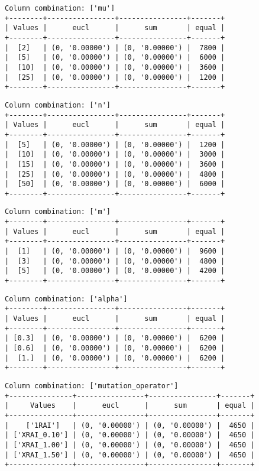\documentclass{article}
\begin{document}
\begin{verbatim}
Column combination: ['mu']
+--------+----------------+----------------+-------+
| Values |      eucl      |      sum       | equal |
+--------+----------------+----------------+-------+
|  [2]   | (0, '0.00000') | (0, '0.00000') |  7800 |
|  [5]   | (0, '0.00000') | (0, '0.00000') |  6000 |
|  [10]  | (0, '0.00000') | (0, '0.00000') |  3600 |
|  [25]  | (0, '0.00000') | (0, '0.00000') |  1200 |
+--------+----------------+----------------+-------+
\end{verbatim}

\begin{verbatim}
Column combination: ['n']
+--------+----------------+----------------+-------+
| Values |      eucl      |      sum       | equal |
+--------+----------------+----------------+-------+
|  [5]   | (0, '0.00000') | (0, '0.00000') |  1200 |
|  [10]  | (0, '0.00000') | (0, '0.00000') |  3000 |
|  [15]  | (0, '0.00000') | (0, '0.00000') |  3600 |
|  [25]  | (0, '0.00000') | (0, '0.00000') |  4800 |
|  [50]  | (0, '0.00000') | (0, '0.00000') |  6000 |
+--------+----------------+----------------+-------+
\end{verbatim}

\begin{verbatim}
Column combination: ['m']
+--------+----------------+----------------+-------+
| Values |      eucl      |      sum       | equal |
+--------+----------------+----------------+-------+
|  [1]   | (0, '0.00000') | (0, '0.00000') |  9600 |
|  [3]   | (0, '0.00000') | (0, '0.00000') |  4800 |
|  [5]   | (0, '0.00000') | (0, '0.00000') |  4200 |
+--------+----------------+----------------+-------+
\end{verbatim}

\begin{verbatim}
Column combination: ['alpha']
+--------+----------------+----------------+-------+
| Values |      eucl      |      sum       | equal |
+--------+----------------+----------------+-------+
| [0.3]  | (0, '0.00000') | (0, '0.00000') |  6200 |
| [0.6]  | (0, '0.00000') | (0, '0.00000') |  6200 |
|  [1.]  | (0, '0.00000') | (0, '0.00000') |  6200 |
+--------+----------------+----------------+-------+
\end{verbatim}

\begin{verbatim}
Column combination: ['mutation_operator']
+---------------+----------------+----------------+-------+
|     Values    |      eucl      |      sum       | equal |
+---------------+----------------+----------------+-------+
|    ['1RAI']   | (0, '0.00000') | (0, '0.00000') |  4650 |
| ['XRAI_0.10'] | (0, '0.00000') | (0, '0.00000') |  4650 |
| ['XRAI_1.00'] | (0, '0.00000') | (0, '0.00000') |  4650 |
| ['XRAI_1.50'] | (0, '0.00000') | (0, '0.00000') |  4650 |
+---------------+----------------+----------------+-------+
\end{verbatim}
\end{document}
